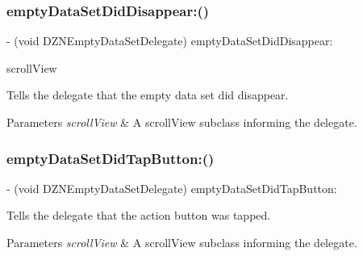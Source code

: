 \subsubsection{\texorpdfstring{empty\+Data\+Set\+Did\+Disappear\+:()}{emptyDataSetDidDisappear:()}}
{\footnotesize\ttfamily -\/ (void D\+Z\+N\+Empty\+Data\+Set\+Delegate) empty\+Data\+Set\+Did\+Disappear\+: \begin{DoxyParamCaption}\item[{(U\+I\+Scroll\+View $\ast$)}]{scroll\+View }\end{DoxyParamCaption}\hspace{0.3cm}{\ttfamily [optional]}}

Tells the delegate that the empty data set did disappear.


\begin{DoxyParams}{Parameters}
{\em scroll\+View} & A scroll\+View subclass informing the delegate. \\
\hline
\end{DoxyParams}
\mbox{\label{protocol_d_z_n_empty_data_set_delegate_01-p_ac8365a63f5518b51f04d4a9e489b2c20}} 
\subsubsection{\texorpdfstring{empty\+Data\+Set\+Did\+Tap\+Button\+:()}{emptyDataSetDidTapButton:()}}
{\footnotesize\ttfamily -\/ (void D\+Z\+N\+Empty\+Data\+Set\+Delegate) empty\+Data\+Set\+Did\+Tap\+Button\+: \begin{DoxyParamCaption}\item[{(-\/empty\+Data\+Set\+:did\+Tap\+Button\+:\+D\+Z\+N\+Empty\+Data\+Set\+Deprecated)}]{ }\end{DoxyParamCaption}\hspace{0.3cm}{\ttfamily [optional]}}

Tells the delegate that the action button was tapped.


\begin{DoxyParams}{Parameters}
{\em scroll\+View} & A scroll\+View subclass informing the delegate. \\
\hline
\end{DoxyParams}
\mbox{\label{protocol_d_z_n_empty_data_set_delegate_01-p_a8a130679d622b9d270f03745045bfbb3}} 
